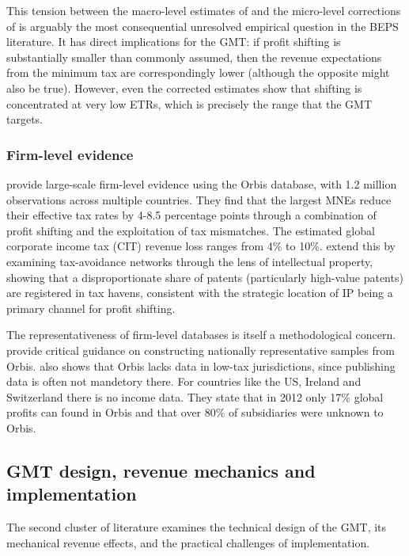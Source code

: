 \documentclass[11pt,a4paper]{article}
\begin{document}
This tension between the macro-level estimates of \citeauthor{torslov2022} and the micro-level corrections of \citeauthor{blouin2023} is arguably the most consequential unresolved empirical question in the BEPS literature. It has direct implications for the GMT: if profit shifting is substantially smaller than commonly assumed, then the revenue expectations from the minimum tax are correspondingly lower (although the opposite might also be true). However, even the corrected estimates show that shifting is concentrated at very low ETRs, which is precisely the range that the GMT targets.

\subsubsection{Firm-level evidence}

\citet{johansson2017} provide large-scale firm-level evidence using the Orbis database, with 1.2 million observations across multiple countries. They find that the largest MNEs reduce their effective tax rates by 4-8.5 percentage points through a combination of profit shifting and the exploitation of tax mismatches. The estimated global corporate income tax (CIT) revenue loss ranges from 4\% to 10\%. \citet{bilicka2023} extend this by examining tax-avoidance networks through the lens of intellectual property, showing that a disproportionate share of patents (particularly high-value patents) are registered in tax havens, consistent with the strategic location of IP being a primary channel for profit shifting.

The representativeness of firm-level databases is itself a methodological concern. \citet{ozcan2015} provide critical guidance on constructing nationally representative samples from Orbis. \citet{torslov2022} also shows that Orbis lacks data in low-tax jurisdictions, since publishing data is often not mandetory there. For countries like the US, Ireland and Switzerland there is no income data. They state that in 2012 only 17\% global profits can found in Orbis and that over 80\% of subsidiaries were unknown to Orbis. 

\subsection{GMT design, revenue mechanics and implementation}\label{sec:design}

The second cluster of literature examines the technical design of the GMT, its mechanical revenue effects, and the practical challenges of implementation.
\end{document}
